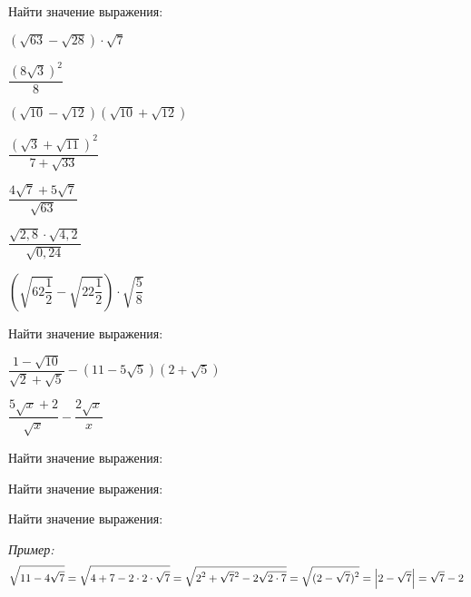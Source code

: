 \begin{listofex}
	\item Найти значение выражения:
	\begin{enumcols}[itemcolumns=3]
		\item \( (\sqrt{63}-\sqrt{28}) \cdot \sqrt{7} \)
		\item \( \dfrac{(8\sqrt{3})^2}{8} \)
		\item \( (\sqrt{10}-\sqrt{12})(\sqrt{10}+\sqrt{12}) \)
		\item \( \dfrac{(\sqrt{3}+\sqrt{11})^2}{7+\sqrt{33}} \)
		\item \( \dfrac{4\sqrt{7}+5\sqrt{7}}{\sqrt{63}} \)
		\item \( \dfrac{\sqrt{2,8} \cdot \sqrt{4,2}}{\sqrt{0,24}} \)
		\item \( \left( \sqrt{62\dfrac{1}{2}}-\sqrt{22\dfrac{1}{2}} \right)\cdot\sqrt{\dfrac{5}{8}} \)
	\end{enumcols}
	\item Найти значение выражения:
	\begin{enumcols}[itemcolumns=2]
		\item \( \dfrac{1-\sqrt{10}}{\sqrt{2}+\sqrt{5}}-(11-5\sqrt{5})(2+\sqrt{5}) \)
		\item \( \dfrac{5\sqrt{x}+2}{\sqrt{x}}-\dfrac{2\sqrt{x}}{x} \)
	\end{enumcols}
	\item Найти значение выражения:
	\begin{enumcols}[itemcolumns=1]
		\item {}
		\item {}
	\end{enumcols}
	\item {}
	\item Найти значение выражения:
	\begin{enumcols}[itemcolumns=2]
		\item {}
		\item {}
		\item {}
		\item {}
	\end{enumcols}
	\item {}
	\item Найти значение выражения:
	
	\textit{Пример:} \[ \sqrt{11-4\sqrt{7}}=\sqrt{4+7-2\cdot2\cdot\sqrt{7}}=\sqrt{\displaystyle2\mathstrut^2+\sqrt{7}\mathstrut^2-2\sqrt{2\cdot7}}=\sqrt{\displaystyle(2-\sqrt{7})^2}=\left|2-\sqrt{7}\right|=\sqrt{7} - 2 \]
	\begin{enumcols}[itemcolumns=2]
		\item {}
		\item {}
	\end{enumcols}
\end{listofex}